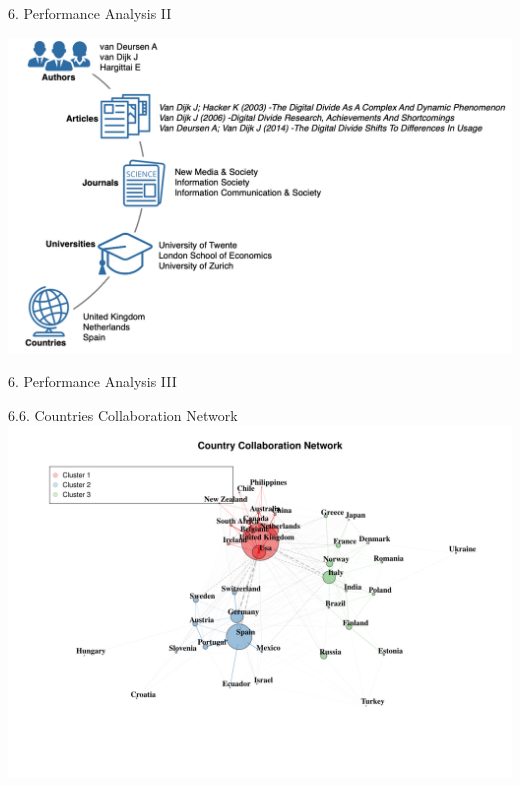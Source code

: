 \documentclass[
  ignorenonframetext,
]{beamer}
\begin{document}
\begin{frame}{6. Performance Analysis II}
\protect\hypertarget{performance-analysis-ii}{}
\vspace{0.5cm}

\begin{center}
\includegraphics[width=1\textwidth]{pic_2.png}
\end{center}
\end{frame}

\begin{frame}{6. Performance Analysis III}
\protect\hypertarget{performance-analysis-iii}{}
\begin{block}{6.6. Countries Collaboration Network}
\protect\hypertarget{countries-collaboration-network}{}
\includegraphics{Presentation_bibliometric_Urbino_may_23_files/figure-beamer/Network CO-1.pdf}
\end{block}
\end{frame}
\end{document}
